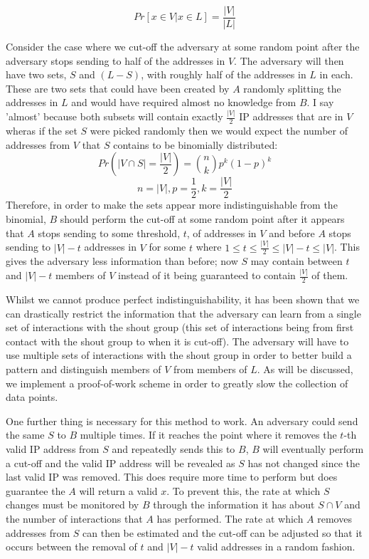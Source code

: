 \documentclass[ %
                    author={Luke Murray},
                supervisor={Dr. Simon Hollis},
                     title={Shadow Peer-to-Peer Networks},
                  subtitle={},
                    degree={MEng},
                      year={2013} ]{thesis}
\begin{document}
\[Pr[x \in V | x \in L] = \frac{|V|}{|L|}\]

Consider the case where we cut-off the adversary at some random point after the adversary stops sending to half of the addresses in $V$. The adversary will then have two sets, $S$ and $(L - S)$, with roughly half of the addresses in $L$ in each. These are two sets that could have been created by $A$ randomly splitting the addresses in $L$ and would have required almost no knowledge from $B$. I say 'almost' because both subsets will contain exactly $\frac{|V|}{2}$ IP addresses that are in $V$ wheras if the set $S$ were picked randomly then we would expect the number of addresses from $V$ that $S$ contains to be binomially distributed: \[Pr(|V \cap S| = \frac{|V|}{2}) = {n \choose k}p^{k}(1-p)^{k}\]\[n = |V|, p = \frac{1}{2}, k = \frac{|V|}{2}\] Therefore, in order to make the sets appear more indistinguishable from the binomial, $B$ should perform the cut-off at some random point after it appears that $A$ stops sending to some threshold, $t$, of addresses in $V$ and before $A$ stops sending to $|V| - t$ addresses in $V$ for some $t$ where $1 \leq t \leq \frac{|V|}{2} \leq |V| - t \leq |V|$. This gives the adversary less information than before; now $S$ may contain between $t$ and $|V| - t$ members of $V$ instead of it being guaranteed to contain $\frac{|V|}{2}$ of them.

Whilst we cannot produce perfect indistinguishability, it has been shown that we can drastically restrict the information that the adversary can learn from a single set of interactions with the shout group (this set of interactions being from first contact with the shout group to when it is cut-off). The adversary will have to use multiple sets of interactions with the shout group in order to better build a pattern and distinguish members of $V$ from members of $L$. As will be discussed, we implement a proof-of-work scheme in order to greatly slow the collection of data points.

One further thing is necessary for this method to work. An adversary could send the same $S$ to $B$ multiple times. If it reaches the point where it removes the $t$-th valid IP address from $S$ and repeatedly sends this to $B$, $B$ will eventually perform a cut-off and the valid IP address will be revealed as $S$ has not changed since the last valid IP was removed. This does require more time to perform but does guarantee the $A$ will return a valid $x$. To prevent this, the rate at which $S$ changes must be monitored by $B$ through the information it has about $S \cap V$ and the number of interactions that $A$ has performed. The rate at which $A$ removes addresses from $S$ can then be estimated and the cut-off can be adjusted so that it occurs between the removal of $t$ and $|V| - t$ valid addresses in a random fashion.
\end{document}
